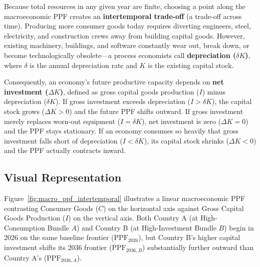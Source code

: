 \documentclass[11pt,letterpaper]{article}
\begin{document}
Because total resources in any given year are finite, choosing a point along the macroeconomic PPF creates an \textbf{intertemporal trade-off} (a trade-off across time). Producing more consumer goods today requires diverting engineers, steel, electricity, and construction crews away from building capital goods. However, existing machinery, buildings, and software constantly wear out, break down, or become technologically obsolete—a process economists call \textbf{depreciation ($\delta K$)}, where $\delta$ is the annual depreciation rate and $K$ is the existing capital stock.

Consequently, an economy's future productive capacity depends on \textbf{net investment ($\Delta K$)}, defined as gross capital goods production ($I$) minus depreciation ($\delta K$). If gross investment exceeds depreciation ($I > \delta K$), the capital stock grows ($\Delta K > 0$) and the future PPF shifts outward. If gross investment merely replaces worn-out equipment ($I = \delta K$), net investment is zero ($\Delta K = 0$) and the PPF stays stationary. If an economy consumes so heavily that gross investment falls short of depreciation ($I < \delta K$), its capital stock shrinks ($\Delta K < 0$) and the PPF actually contracts inward.

\subsection*{Visual Representation}
Figure~\ref{fig:macro_ppf_intertemporal} illustrates a linear macroeconomic PPF contrasting Consumer Goods ($C$) on the horizontal axis against Gross Capital Goods Production ($I$) on the vertical axis. Both Country A (at High-Consumption Bundle $A$) and Country B (at High-Investment Bundle $B$) begin in 2026 on the same baseline frontier ($\text{PPF}_{2026}$), but Country B's higher capital investment shifts its 2036 frontier ($\text{PPF}_{2036,B}$) substantially further outward than Country A's ($\text{PPF}_{2036,A}$).
\end{document}
